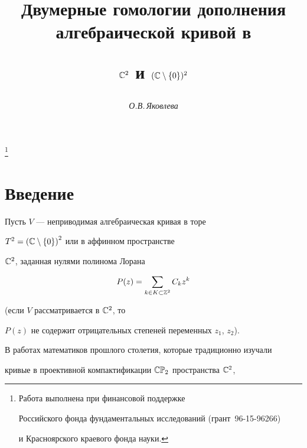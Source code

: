 \author{\it О.В.\,Яковлева}




\title{Двумерные гомологии дополнения\\ алгебраической кривой в


$\Bbb C^2$  и $(\Bbb C\setminus \{0\})^2$}


\thanks{Работа выполнена при финансовой поддержке


Российского фонда фундаментальных исследований (грант \No\,96-15-96266)


и Красноярского краевого фонда науки.}





\date{}




\pagestyle{plain} %







\maketitle


\label{begin}





\section{Введение}





Пусть $V$ --- неприводимая алгебраическая кривая в торе


$T^2={( \Bbb C\setminus \{0\})}^2$ или в аффинном пространстве


$\Bbb C^2$, заданная нулями полинома Лорана


$$


P(z)=\sum\limits_{k\in K\subset \Bbb Z^2} C_k z^k


$$


(если $V$ рассматривается в $\Bbb C^2$, то


$P(z)$ не содержит отрицательных степеней переменных $z_1$, $z_2$).


В работах математиков прошлого столетия, которые традиционно изучали


кривые в проективной компактификации $\Bbb{CP}_2$ пространства $\Bbb C^2$,


